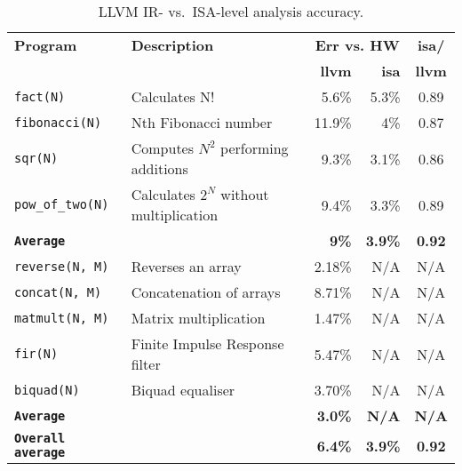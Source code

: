 \documentclass{llncs}
\newcommand{\level}{level\xspace}
\newcommand{\llvmir}{LLVM IR\xspace}
\newcommand{\tabend}{\vspace*{-5mm}}
\begin{document}
\begin{table}[ht]
\centering


\begin{tabular}{|l|l|r|r|c|}
\hline 
\textbf{Program} &\textbf{Description} & \multicolumn{2}{c|}{\textbf{Err vs. HW}} & \textbf{isa/}
\\  \cline{3-4}
&&\textbf{llvm}&\textbf{isa}&\textbf{llvm}
\\ \hline \hline 

\texttt{fact(N)}  &  Calculates N!      & 5.6\% & 5.3\% & 0.89
\\  \hline 
\texttt{fibonacci(N)}  &   Nth Fibonacci number   & 11.9\%& 4\%& 0.87
\\ \hline 
\texttt{sqr(N)}     &     Computes $N^2$ performing additions    & 9.3\%&3.1\% & 0.86
\\ \hline 
\texttt{pow\_of\_two(N)}   &   Calculates $2^N$ without multiplication & 9.4\% &3.3\% & 0.89
\\ \hline 
\texttt{\textbf{Average}} & & \textbf{9\%} & \textbf{3.9\%} & \textbf{0.92}
\\ \hline \hline
\texttt{reverse(N, M)} &  Reverses an array  & 2.18\%& N/A& N/A
\\ \hline 
\texttt{concat(N, M)}  &  Concatenation of arrays   &8.71\%&N/A& N/A
\\ \hline 
\texttt{matmult(N, M)}  &  Matrix multiplication  & 1.47\% & N/A & N/A
\\ \hline 
\texttt{fir(N)} & Finite Impulse Response filter & 5.47\% & N/A & N/A
\\ 
\hline
\texttt{biquad(N)} & Biquad equaliser & 3.70\% & N/A & N/A
\\ 
\hline 
\texttt{\textbf{Average}} & & \textbf{3.0\%} & \textbf{N/A} & \textbf{N/A}
\\ \hline
\hline 
\texttt{\textbf{Overall average}} & & \textbf{6.4\%} & \textbf{3.9\%} & \textbf{0.92}
\\ \hline
\end{tabular}
\caption{\llvmir- vs.\ ISA-\level analysis accuracy.}
\label{tab:isa-llvm-comparison}
\tabend
\tabend
\end{table}
\end{document}
